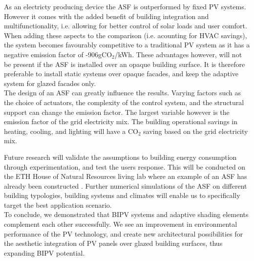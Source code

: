 

As an electricty producing device the ASF is outperformed by fixed PV systems. However it comes with the added benefit of building integration and multifunctionality, i.e. allowing for better control of solar loads and user comfort. When adding these aspects to the comparison (i.e. acounting for HVAC savings), the system becomes favourably competitive to a traditional PV system as it has a negative emission factor of -906gCO${_2}$/kWh. These advantages however, will not be present if the ASF is installed over an opaque building surface. It is therefore preferable to install static systems over opaque facades, and keep the adaptive system for glazed facades only.\\

The design of an ASF can greatly influence the results. Varying factors such as the choice of actuators, the complexity of the control system, and the structural support can change the emission factor. The largest variable however is the emission factor of the grid electricity mix. The building operational savings in heating, cooling, and lighting will have a CO${_2}$ saving based on the grid electricity mix. 

Future research will validate the assumptions to building energy consumption through experimentation, and test the users response. This will be conducted on the ETH House of Natural Resources living lab where an example of an ASF has already been constructed \cite{nagy2015frontiers}. Further numerical simulations of the ASF on different building typologies, building systems and climates will enable us to specifically target the best application scenario. \\

To conclude, we demonstrated that BIPV systems and adaptive shading elements complement each other successfully. We see an improvement in environmental performance of the PV technology, and create new architectural possibilities for the aesthetic integration of PV panels over glazed building surfaces, thus expanding BIPV potential. 






